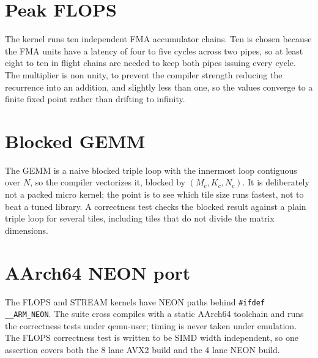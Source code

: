 \section{Peak FLOPS}

The kernel runs ten independent FMA accumulator chains. Ten is chosen because
the FMA units have a latency of four to five cycles across two pipes, so at least
eight to ten in flight chains are needed to keep both pipes issuing every cycle.
The multiplier is non unity, to prevent the compiler strength reducing the
recurrence into an addition, and slightly less than one, so the values converge
to a finite fixed point rather than drifting to infinity.

\section{Blocked GEMM}

The GEMM is a naive blocked triple loop with the innermost loop contiguous over
$N$, so the compiler vectorizes it, blocked by $(M_c, K_c, N_c)$. It is
deliberately not a packed micro kernel; the point is to see which tile size runs
fastest, not to beat a tuned library. A correctness test checks the blocked
result against a plain triple loop for several tiles, including tiles that do
not divide the matrix dimensions.

\section{AArch64 NEON port}

The FLOPS and STREAM kernels have NEON paths behind \texttt{\#ifdef
\_\_ARM\_NEON}. The suite cross compiles with a static AArch64 toolchain and runs
the correctness tests under qemu-user; timing is never taken under emulation. The
FLOPS correctness test is written to be SIMD width independent, so one assertion
covers both the 8 lane AVX2 build and the 4 lane NEON build.
